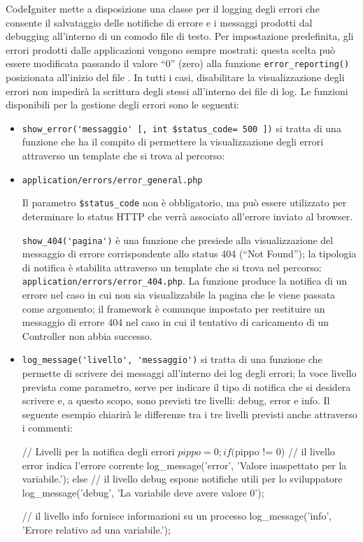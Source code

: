 CodeIgniter mette a disposizione una classe per il logging degli errori che consente il salvataggio delle notifiche di errore e i messaggi prodotti dal debugging all'interno di un comodo file di testo. Per impostazione predefinita, gli errori prodotti dalle applicazioni vengono sempre mostrati: questa scelta può essere modificata passando il valore ``0'' (zero) alla funzione \verb|error_reporting()| posizionata all'inizio del file . In tutti i casi, disabilitare la visualizzazione degli errori non impedirà la scrittura degli stessi all'interno dei file di log. Le funzioni disponibili per la gestione degli errori sono le seguenti:

\begin{itemize}
\item \verb|show_error('messaggio' [, int $status_code= 500 ])| si tratta di una funzione che ha il compito di permettere la visualizzazione degli errori attraverso un template che si trova al percorso:

\item \verb|application/errors/error_general.php|

Il parametro \verb|$status_code| non è obbligatorio, ma può essere utilizzato per determinare lo status \ac{HTTP} che verrà associato all'errore inviato al browser.

\verb|show_404('pagina')| è una funzione che presiede alla visualizzazione del messaggio di errore corrispondente allo status 404 (``Not Found''); la tipologia di notifica è stabilita attraverso un template che si trova nel percorso: \verb|application/errors/error_404.php|. La funzione produce la notifica di un errore nel caso in cui non sia visualizzabile la pagina che le viene passata come argomento; il framework è comunque impostato per restituire un messaggio di errore 404 nel caso in cui il tentativo di caricamento di un Controller non abbia successo.

\item \verb|log_message('livello', 'messaggio')| si tratta di una funzione che permette di scrivere dei messaggi all'interno dei log degli errori; la voce livello prevista come parametro, serve per indicare il tipo di notifica che si desidera scrivere e, a questo scopo, sono previsti tre livelli: debug, error e info. Il seguente esempio chiarirà le differenze tra i tre livelli previsti anche attraverso i commenti:

\begin{code}
// Livelli per la notifica degli errori
$pippo = 0; 
if ($pippo != 0)
{
  // il livello error indica l'errore corrente
  log_message('error', 'Valore inaspettato per la variabile.');
}
else
{
  // il livello debug espone notifiche utili per lo sviluppatore 
  log_message('debug', 'La variabile deve avere valore 0');
}

// il livello info fornisce informazioni su un processo
log_message('info', 'Errore relativo ad una variabile.');
\end{code}

\end{itemize}

